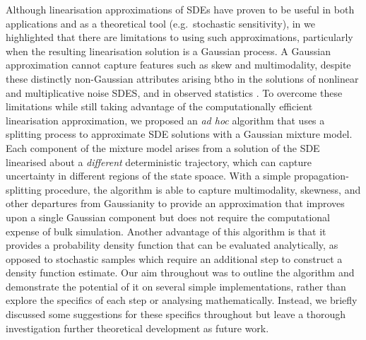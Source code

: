 Although linearisation approximations of SDEs have proven to be useful in both applications and as a theoretical tool (e.g.\ stochastic sensitivity), in  we highlighted that there are limitations to using such approximations, particularly when the resulting linearisation solution is a Gaussian process.
A Gaussian approximation cannot capture features such as skew and multimodality, despite these distinctly non-Gaussian attributes arising btho in the solutions of nonlinear and multiplicative noise SDES, and in observed statistics \citep{SuraEtAl_2005_MultiplicativeNoiseNonGaussianity,del-Castillo-Negrete_1998_AsymmetricTransportNonGaussian,BraccoEtAl_2000_VelocityProbabilityDensity}.
To overcome these limitations while still taking advantage of the computationally efficient linearisation approximation, we proposed an \emph{ad hoc} algorithm that uses a splitting process to approximate SDE solutions with a Gaussian mixture model.
Each component of the mixture model arises from a solution of the SDE linearised about a \emph{different} deterministic trajectory, which can capture uncertainty in different regions of the state spoace.
With a simple propagation-splitting procedure, the algorithm is able to capture multimodality, skewness, and other departures from Gaussianity to provide an approximation that improves upon a single Gaussian component but does not require the computational expense of bulk simulation.
Another advantage of this algorithm is that it provides a probability density function that can be evaluated analytically, as opposed to stochastic samples which require an additional step to construct a density function estimate.
Our aim throughout was to outline the algorithm and demonstrate the potential of it on several simple implementations, rather than explore the specifics of each step or analysing mathematically.
Instead, we briefly discussed some suggestions for these specifics throughout  but leave a thorough investigation further theoretical development as future work.

